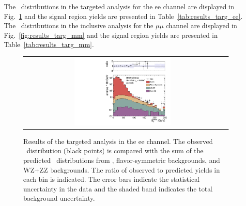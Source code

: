 \clearpage

The \MET\ distributions in the targeted analysis for the ee channel are displayed in Fig.~\ref{fig:results_targ_ee} and 
the signal region yields are presented in Table~\ref{tab:results_targ_ee}.
The \MET\ distributions in the inclusive analysis for the $\mu\mu$ channel are displayed in Fig.~\ref{fig:results_targ_mm} and 
the signal region yields are presented in Table~\ref{tab:results_targ_mm}.

\begin{figure}[!h]
\begin{center}
\begin{tabular}{cc}
\includegraphics[width=0.5\textwidth]{plots/pfmet_bveto_ee_19p5fb.pdf}
\end{tabular}
\caption{Results of the targeted analysis in the ee channel. The observed \MET\ distribution (black points) is compared with the sum of the predicted \MET\
distributions from \zjets, flavor-symmetric backgrounds, and WZ+ZZ backgrounds. The ratio of observed to predicted yields in each bin is
indicated. The error bars indicate the statistical uncertainty in the data and the shaded band indicates the total background uncertainty.
\label{fig:results_targ_ee}
}
\end{center}
\end{figure}




